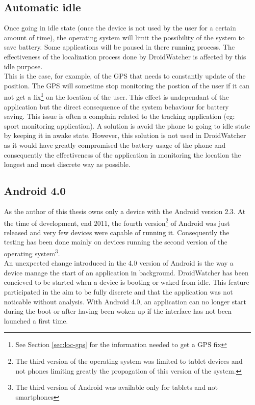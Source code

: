 \subsection{Automatic idle}

Once going in idle state (once the device is not used by the user for a certain amount of time), the operating system will limit the possibility of the system to save battery.
Some applications will be paused in there running process.
The effectiveness of the localization process done by DroidWatcher is affected by this idle purpose.\\

This is the case, for example, of the GPS that needs to constantly update of the position.
The GPS will sometime stop monitoring the postion of the user if it can not get a fix\footnote{See Section \ref{sec:loc-gps} for the information needed to get a GPS fix} on the location of the user.
This effect is undependant of the application but the direct consequence of the system behaviour for battery saving. 
This issue is often a complain related to the tracking application (eg: sport monitoring application).
A solution is avoid the phone to going to idle state by keeping it in awake state.
However, this solution is not used in DroidWatcher as it would have greatly compromised the battery usage of the phone and consequently the effectiveness of the application in monitoring the location the longest and most discrete way as possible.

\subsection{Android 4.0}
\label{sec:dw-ics}

As the author of this thesis owns only a device with the Android version 2.3.
At the time of development, end 2011, the fourth version\footnote{The third version of the operating system was limited to tablet devices and not phones limiting greatly the propagation of this version of the system.} of Android was just released and very few devices were capable of running it.
Consequently the testing has been done mainly on devices running the second version of the operating system\footnote{The third version of Android was available only for tablets and not smartphones}.\\

An unexpected change introduced in the 4.0 version of Android is the way a device manage the start of an application in background.
DroidWatcher has been concieved to be started when a device is booting or waked from idle.
This feature participated in the aim to be fully discrete and that the application was not noticable without analysis.
With Android 4.0, an application can no longer start during the boot or after having been woken up if the interface has not been launched a first time.\\

